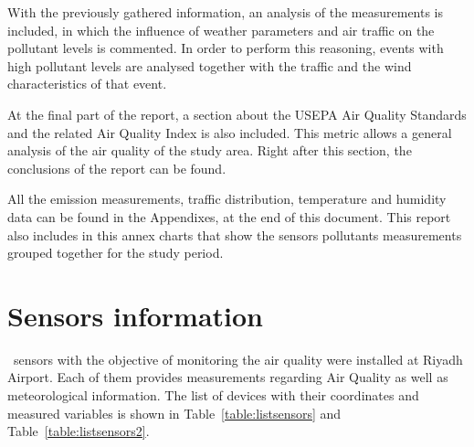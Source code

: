 \documentclass[12pt, oneside]{book}
\begin{document}
With the previously gathered information, an analysis of the measurements is included, in which the influence of weather parameters and air traffic on the pollutant levels is commented. In order to perform this reasoning, events with high pollutant levels are analysed together with the traffic and the wind characteristics of that event.

At the final part of the report, a section about the USEPA Air Quality Standards and the related Air Quality Index is also included. This metric allows a general analysis of the air quality of the study area. Right after this section, the conclusions of the report can be found.

All the emission measurements, traffic distribution, temperature and humidity data can be found in the Appendixes, at the end of this document. This report also includes in this annex charts that show the sensors pollutants measurements grouped together for the study period.

\emptystations 	




\chapter{Sensors information}

\stationsnbr\ sensors with the objective of monitoring the air quality were installed at Riyadh Airport. Each of them provides measurements regarding Air Quality as well as meteorological information. The list of devices with their coordinates and measured variables is shown in Table~\ref{table:listsensors} and Table~\ref{table:listsensors2}.
\end{document}
